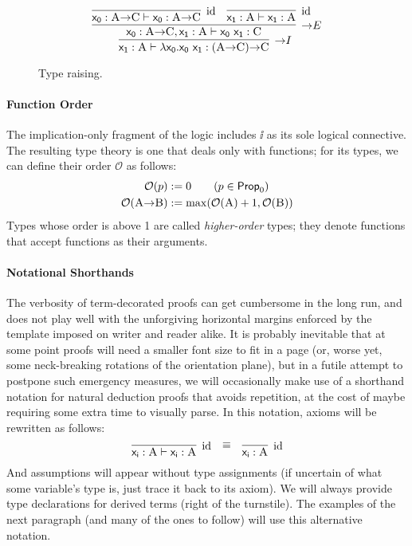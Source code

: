 \begin{figure}
	\[
		\infer[\ii I]{\term{x_1}: \prop{A} \vdash \term{\lambda x_0.x_0~x_1}: (\prop{A} \ii \prop{C}) \ii \prop{C}}{
			\infer[\ii E]{\term{x_0}: \prop{A} \ii \prop{C}, \term{x_1}: \prop{A} \vdash \term{x_0~x_1}: \prop{C}}{
				\infer[\Ax]{\term{x_0}: \prop{A} \ii \prop{C} \vdash \term{x_0}: \prop{A} \ii \prop{C}}{}
				&
				\infer[\Ax]{\term{x_1}: \prop{A} \vdash \term{x_1}: \prop{A}}{}
			}
		}
	\]
	\caption{Type raising.}
	\label{figure:type_raising}
\end{figure}

\paragraph{Function Order} The implication-only fragment of the logic includes $\ii$ as its sole logical connective.
The resulting type theory is one that deals only with functions; for its types, we can define their order $\mathcal{O}$ as follows:
\begin{align*}
\mathcal{O}(p) & := 0 \tag{$p \in \propcon{}$} \\
\mathcal{O}(\prop{A} \ii \prop{B}) & := \mathrm{max}(\mathcal{O}(\prop{A}) + 1, \mathcal{O}(\prop{B}))\\
\end{align*}
Types whose order is above 1 are called \textit{higher-order} types; they denote functions that accept functions as their arguments.

\paragraph{Notational Shorthands}
The verbosity of term-decorated proofs can get cumbersome in the long run, and does not play well with the unforgiving horizontal margins enforced by the template imposed on writer and reader alike.
It is probably inevitable that at some point proofs will need a smaller font size to fit in a page (or, worse yet, some neck-breaking rotations of the orientation plane), but in a futile attempt to postpone such emergency measures, we will occasionally make use of a shorthand notation for natural deduction proofs that avoids repetition, at the cost of maybe requiring some extra time to visually parse.
In this notation, axioms will be rewritten as follows:
\[
\infer[\Ax]{\term{x_i}: \prop{A} \vdash \term{x_i}: \prop{A}}{} \quad \raisebox{7pt}{$\equiv$} \quad \infer[\Ax]{\term{x_i}:\prop{A}}{}
\]
And assumptions will appear without type assignments (if uncertain of what some variable's type is, just trace it back to its axiom). 
We will always provide type declarations for derived terms (right of the turnstile).
The examples of the next paragraph (and many of the ones to follow) will use this alternative notation.

